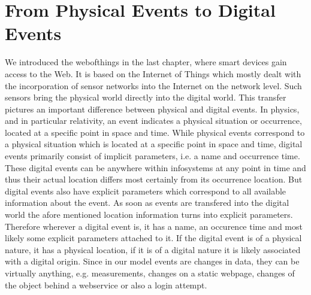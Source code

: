 \section{From Physical Events to Digital Events}
We introduced the \textrm{\gls{webofthings}} in the last chapter, where smart devices gain access to the Web.
It is based on the \textrm{Internet of Things} which mostly dealt with the incorporation of sensor networks into the Internet on the network level.
Such sensors bring the physical world directly into the digital world.
This transfer pictures an important difference between physical and digital events.
In physics, and in particular relativity, an event indicates a physical situation or occurrence, located at a specific point in space and time.
While physical events correspond to a physical situation which is located at a specific point in space and time, digital events primarily consist of implicit parameters, i.e. a name and occurrence time.
These digital events can be anywhere within \textrm{\glspl{infosystem}} at any point in time and thus their actual location differs most certainly from its occurrence location.
But digital events also have explicit parameters which correspond to all available information about the event.
As soon as events are transfered into the digital world the afore mentioned location information turns into explicit parameters.
Therefore wherever a digital event is, it has a name, an occurence time and most likely some explicit parameters attached to it.
If the digital event is of a physical nature, it has a physical location, if it is of a digital nature it is likely associated with a digital origin.
Since in our model events are changes in data, they can be virtually anything, e.g. measurements, changes on a static webpage, changes of the object behind a \textrm{\gls{webservice}} or also a login attempt.


